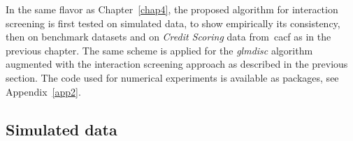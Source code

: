 In the same flavor as Chapter~\ref{chap4}, the proposed algorithm for interaction screening is first tested on simulated data, to show empirically its consistency, then on benchmark datasets and on \textit{Credit Scoring} data from~\gls{cacf} as in the previous chapter. The same scheme is applied for the \textit{glmdisc} algorithm augmented with the interaction screening approach as described in the previous section.
The code used for numerical experiments is available as packages, see Appendix~\ref{app2}.

\subsection{Simulated data}

